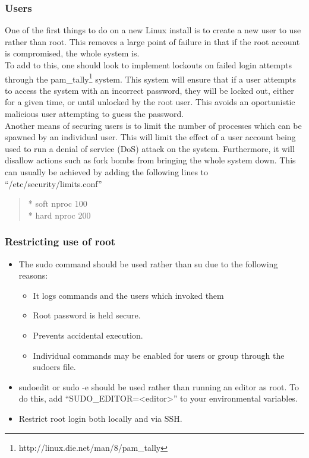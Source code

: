 \documentclass[a4paper,11pt]{report}
\begin{document}
			\subsubsection{Users}
				One of the first things to do on a new Linux install is to create a new user to use rather than root. 
				This removes a large point of failure in that if the root account is compromised, the whole system is.\\ 
				To add to this, one should look to implement lockouts on failed login attempts through the pam\_tally\footnote{http://linux.die.net/man/8/pam\_tally} system.
				This system will ensure that if a user attempts to access the system with an incorrect password, they will be locked out, either for a given time, or until unlocked by the root user. 
				This avoids an oportunistic malicious user attempting to guess the password. \\
				Another means of securing users is to limit the number of processes which can be spawned by an individual user. 
				This will limit the effect of a user account being used to run a denial of service (DoS) attack on the system. 
				Furthermore, it will disallow actions such as fork bombs from bringing the whole system down. 
				This can usually be achieved by adding the following lines to ``/etc/security/limits.conf''
				\begin{quote}
					\begin{flushleft}
						\** soft nproc 100 \\
						\** hard nproc 200 \\
					\end{flushleft}
				\end{quote}

			\subsubsection{Restricting use of root}
				\begin{itemize}
					\item The sudo command should be used rather than su due to the following reasons:
						\begin{itemize}
							\item It logs commands and the users which invoked them
							\item Root password is held secure. 
							\item Prevents accidental execution. 
							\item Individual commands may be enabled for users or group through the sudoers file. 
						\end{itemize}
					\item sudoedit or sudo -e should be used rather than running an editor as root. 
						To do this, add ``SUDO\_EDITOR=<editor>'' to your environmental variables.
					\item Restrict root login both locally and via SSH. 
				\end{itemize}
\end{document}
